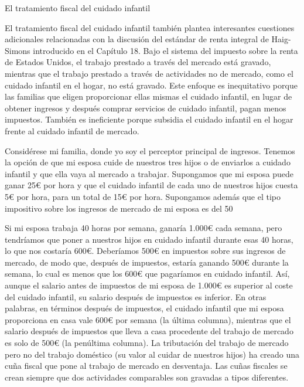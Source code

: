 \documentclass[10pt,a4paper]{article}
\begin{document}
El tratamiento fiscal del cuidado infantil

El tratamiento fiscal del cuidado infantil también plantea interesantes cuestiones adicionales relacionadas con la discusión del estándar de renta integral de Haig-Simons introducido en el Capítulo 18. Bajo el sistema del impuesto sobre la renta de Estados Unidos, el trabajo prestado a través del mercado está gravado, mientras que el trabajo prestado a través de actividades no de mercado, como el cuidado infantil en el hogar, no está gravado. Este enfoque es inequitativo porque las familias que eligen proporcionar ellas mismas el cuidado infantil, en lugar de obtener ingresos y después comprar servicios de cuidado infantil, pagan menos impuestos. También es ineficiente porque subsidia el cuidado infantil en el hogar frente al cuidado infantil de mercado.

Considérese mi familia, donde yo soy el perceptor principal de ingresos. Tenemos la opción de que mi esposa cuide de nuestros tres hijos o de enviarlos a cuidado infantil y que ella vaya al mercado a trabajar. Supongamos que mi esposa puede ganar 25€ por hora y que el cuidado infantil de cada uno de nuestros hijos cuesta 5€ por hora, para un total de 15€ por hora. Supongamos además que el tipo impositivo sobre los ingresos de mercado de mi esposa es del 50 %

Si mi esposa trabaja 40 horas por semana, ganaría 1.000€ cada semana, pero tendríamos que poner a nuestros hijos en cuidado infantil durante esas 40 horas, lo que nos costaría 600€. Deberíamos 500€ en impuestos sobre sus ingresos de mercado, de modo que, después de impuestos, estaría ganando 500€ durante la semana, lo cual es menos que los 600€ que pagaríamos en cuidado infantil. Así, aunque el salario antes de impuestos de mi esposa de 1.000€ es superior al coste del cuidado infantil, su salario después de impuestos es inferior. En otras palabras, en términos después de impuestos, el cuidado infantil que mi esposa proporciona en casa vale 600€ por semana (la última columna), mientras que el salario después de impuestos que lleva a casa procedente del trabajo de mercado es solo de 500€ (la penúltima columna). La tributación del trabajo de mercado pero no del trabajo doméstico (su valor al cuidar de nuestros hijos) ha creado una cuña fiscal que pone al trabajo de mercado en desventaja. Las cuñas fiscales se crean siempre que dos actividades comparables son gravadas a tipos diferentes.
\end{document}
